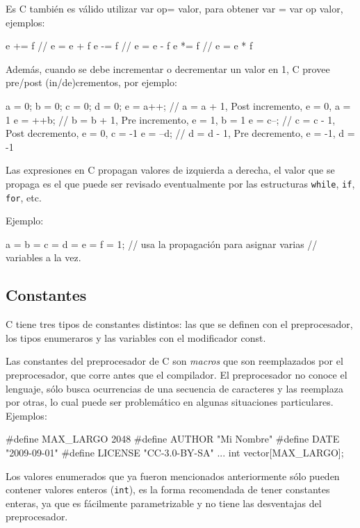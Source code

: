 Es C también es válido utilizar var op= valor, para obtener var = var op
valor, ejemplos:

\begin{codigo-c-plano}
e += f // e = e + f
e -= f // e = e - f
e *= f // e = e * f
\end{codigo-c-plano}

Además, cuando se debe incrementar o decrementar un valor en 1, C provee
pre/post (in/de)crementos, por ejemplo:

\begin{codigo-c-plano}
a = 0; b = 0; c = 0; d = 0;
e = a++; // a = a + 1, Post incremento, e = 0, a = 1
e = ++b; // b = b + 1, Pre incremento, e = 1, b = 1
e = c--; // c = c - 1, Post decremento, e = 0, c = -1
e = --d; // d = d - 1, Pre  decremento, e = -1, d = -1
\end{codigo-c-plano}

Las expresiones en C propagan valores de izquierda a derecha, el valor que se
propaga es el que puede ser revisado eventualmente por las estructuras
\lstinline!while!, \lstinline!if!, \lstinline!for!, etc.

Ejemplo:

\begin{codigo-c-plano}
a = b = c = d = e = f = 1; // usa la propagación para asignar varias
                           // variables a la vez.
\end{codigo-c-plano}

\subsection{Constantes}

C tiene tres tipos de constantes distintos: las que se definen con el
preprocesador, los tipos enumeraros y las variables con el modificador const.

Las constantes del preprocesador de C son \textit{macros} que son reemplazados
por el preprocesador, que corre antes que el compilador. El preprocesador no
conoce el lenguaje, sólo busca ocurrencias de una secuencia de caracteres y
las reemplaza por otras, lo cual puede ser problemático en algunas situaciones
particulares.  Ejemplos:

\begin{codigo-c-plano}
#define MAX_LARGO 2048
#define AUTHOR "Mi Nombre"
#define DATE "2009-09-01"
#define LICENSE "CC-3.0-BY-SA"
...
    int vector[MAX_LARGO];
\end{codigo-c-plano} 

Los valores enumerados que ya fueron mencionados anteriormente sólo pueden
contener valores enteros (\lstinline!int!), es la forma recomendada de tener
constantes enteras, ya que es fácilmente parametrizable y no tiene las
desventajas del preprocesador.

